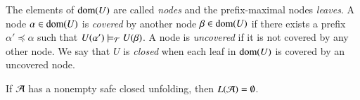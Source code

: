 \documentclass{llncs}
\begin{document}
The elements of $\mathrm{dom}(U)$ are called \emph{nodes} and the
prefix-maximal nodes \emph{leaves}. A node $\alpha \in \mathrm{dom}(U)$ is
\emph{covered} by another node $\beta \in \mathrm{dom}(U)$ if there exists a
prefix $\alpha' \preceq \alpha$ such that $U(\alpha') \models_{\mathcal{T}}
U(\beta)$. A node is \emph{uncovered} if it is not covered by any
other node. We say that $U$ is \emph{closed} when each leaf in
$\mathrm{dom}(U)$ is covered by an uncovered node.

\begin{lemma}\label{lemma:art}
  If $\mathcal{A}$ has a nonempty safe closed unfolding, then $L(\mathcal{A}) =
  \emptyset$.
\end{lemma}
\end{document}
